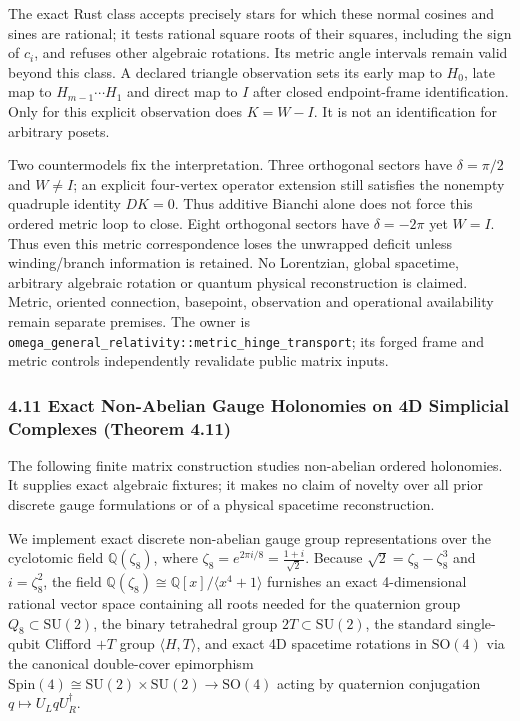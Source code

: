 \documentclass[
  english,
  10pt,
  a4paper,
]{article}
\begin{document}
The exact Rust class accepts precisely stars for which these normal
cosines and sines are rational; it tests rational square roots of their
squares, including the sign of \(c_i\), and refuses other algebraic
rotations. Its metric angle intervals remain valid beyond this class. A
declared triangle observation sets its early map to \(H_0\), late map to
\(H_{m-1}\cdots H_1\) and direct map to \(I\) after closed
endpoint-frame identification. Only for this explicit observation does
\(K=W-I\). It is not an identification for arbitrary posets.

Two countermodels fix the interpretation. Three orthogonal sectors have
\(\delta=\pi/2\) and \(W\ne I\); an explicit four-vertex operator
extension still satisfies the nonempty quadruple identity \(DK=0\). Thus
additive Bianchi alone does not force this ordered metric loop to close.
Eight orthogonal sectors have \(\delta=-2\pi\) yet \(W=I\). Thus even
this metric correspondence loses the unwrapped deficit unless
winding/branch information is retained. No Lorentzian, global spacetime,
arbitrary algebraic rotation or quantum physical reconstruction is
claimed. Metric, oriented connection, basepoint, observation and
operational availability remain separate premises. The owner is
\nolinkurl{omega_general_relativity::metric_hinge_transport}; its forged
frame and metric controls independently revalidate public matrix inputs.

\subsubsection{4.11 Exact Non-Abelian Gauge Holonomies on 4D Simplicial
Complexes (Theorem
4.11)}\label{exact-non-abelian-gauge-holonomies-on-4d-simplicial-complexes-theorem-4.11}

The following finite matrix construction studies non-abelian ordered
holonomies. It supplies exact algebraic fixtures; it makes no claim of
novelty over all prior discrete gauge formulations or of a physical
spacetime reconstruction.

We implement exact discrete non-abelian gauge group representations over
the cyclotomic field \(\mathbb{Q}(\zeta_8)\), where
\(\zeta_8 = e^{2\pi i / 8} = \frac{1+i}{\sqrt{2}}\). Because
\(\sqrt{2} = \zeta_8 - \zeta_8^3\) and \(i = \zeta_8^2\), the field
\(\mathbb{Q}(\zeta_8) \cong \mathbb{Q}[x] / \langle x^4 + 1 \rangle\)
furnishes an exact 4-dimensional rational vector space containing all
roots needed for the quaternion group \(Q_8 \subset \mathrm{SU}(2)\),
the binary tetrahedral group \(2T \subset \mathrm{SU}(2)\), the standard
single-qubit Clifford \(+ T\) group \(\langle H, T \rangle\), and exact
4D spacetime rotations in \(\mathrm{SO}(4)\) via the canonical
double-cover epimorphism
\(\mathrm{Spin}(4) \cong \mathrm{SU}(2) \times \mathrm{SU}(2) \to \mathrm{SO}(4)\)
acting by quaternion conjugation \(q \mapsto U_L q U_R^\dagger\).
\end{document}
